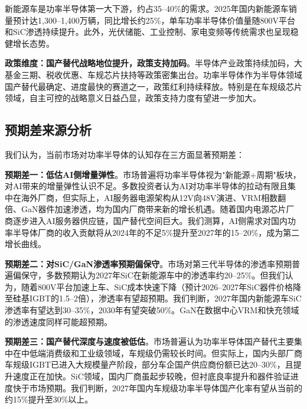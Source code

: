 新能源车是功率半导体第一大下游，约占35--40\%的需求。2025年国内新能源车销量预计达1,300--1,400万辆，同比增长约25\%，单车功率半导体价值量随800V平台和SiC渗透持续提升。此外，光伏储能、工业控制、家电变频等传统需求也呈现稳健增长态势。

\vspace{0.3em}

\textbf{政策维度：国产替代战略地位提升，政策支持加码}。半导体产业政策持续加码，大基金三期、税收优惠、车规芯片扶持等政策密集出台。功率半导体作为半导体领域国产替代最确定、进度最快的赛道之一，政策红利持续释放。特别是在车规级芯片领域，自主可控的战略意义日益凸显，政策支持力度有望进一步加大。

\subsection{预期差来源分析}

我们认为，当前市场对功率半导体的认知存在三方面显著预期差：

\vspace{0.3em}

\textbf{预期差一：低估AI侧增量弹性}。市场普遍将功率半导体视为"新能源+周期"板块，对AI带来的增量弹性认识不足。多数投资者认为AI对功率半导体的拉动有限且集中在海外厂商，但实际上，AI服务器电源架构从12V向48V演进、VRM相数翻倍、GaN器件加速渗透，均为国内厂商带来新的增长机遇。随着国内电源芯片厂商逐步进入AI服务器供应链，国产替代空间巨大。我们测算，AI侧需求对国内功率半导体厂商的收入贡献将从2024年的不足5\%提升至2027年的15--20\%，成为第二增长曲线。

\vspace{0.3em}

\textbf{预期差二：对SiC/GaN渗透率预期偏保守}。市场对第三代半导体的渗透率预期普遍偏保守，多数预期认为2027年SiC在新能源车中的渗透率约20--25\%。但我们认为，随着800V平台加速上车、SiC成本快速下降（预计2026--2027年SiC器件价格降至硅基IGBT的1.5--2倍），渗透率有望超预期。我们判断，2027年国内新能源车SiC渗透率有望达到30--35\%，2030年有望突破50\%。GaN在数据中心VRM和快充领域的渗透速度同样可能超预期。

\vspace{0.3em}

\textbf{预期差三：国产替代深度与速度被低估}。市场普遍认为功率半导体国产替代主要集中在中低端消费级和工业级领域，车规级仍需较长时间。但实际上，国内头部厂商车规级IGBT已进入大规模量产阶段，部分车企国产供应商份额已达20--30\%，且提升速度正在加快。SiC领域，国内厂商虽起步较晚，但衬底良率提升和器件验证进度快于市场预期。我们判断，2027年国内车规级功率半导体国产化率有望从当前的约15\%提升至30\%以上。

